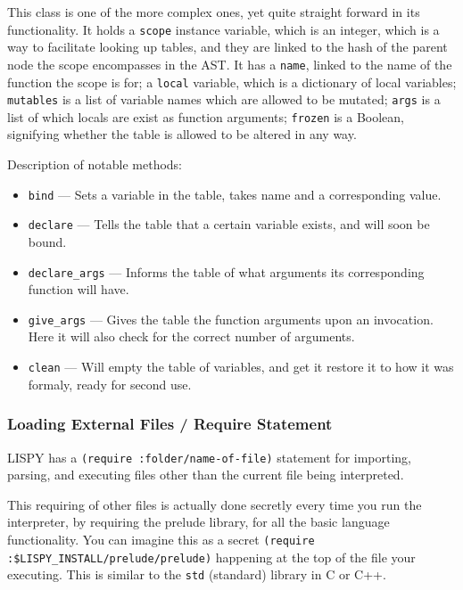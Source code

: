 \documentclass{article}
\newcommand{\code}[1]{\texttt{#1}}
\begin{document}
       This class is one of the more complex ones, yet quite straight forward in
       its functionality.  It holds a \code{scope} instance variable, which is an integer,
       which is a way to facilitate looking up tables, and they are linked to the hash
       of the parent node the scope encompasses in the AST. It has a \code{name}, linked
       to the name of the function the scope is for; a \code{local} variable, which
       is a dictionary of local variables; \code{mutables} is a list of variable names
       which are allowed to be mutated; \code{args} is a list of which locals are
       exist as function arguments; \code{frozen} is a Boolean, signifying whether the
       table is allowed to be altered in any way.

       Description of notable methods:
       \begin{itemize}
         \item \code{bind} --- Sets a variable in the table, takes name and a corresponding
         value.
         \item \code{declare} --- Tells the table that a certain variable exists, and
         will soon be bound.
         \item \code{declare\_args} --- Informs the table of what arguments its corresponding
         function will have.
         \item \code{give\_args} --- Gives the table the function arguments upon an invocation.
         Here it will also check for the correct number of arguments.
         \item \code{clean} --- Will empty the table of variables, and get it restore it to
         how it was formaly, ready for second use.
       \end{itemize}


       \clearpage



    \subsubsection{Loading External Files / Require Statement}
      LISPY has a \code{(require :folder/name-of-file)} statement for importing, parsing,
      and executing files other than the current file being interpreted.

      This requiring of other files is actually done secretly every time you run the interpreter,
      by requiring the prelude library, for all the basic language functionality.
      You can imagine this as a secret \code{(require :\$LISPY\_INSTALL/prelude/prelude)}
      happening at the top of the file your executing. This is similar to the \code{std}
      (standard) library in C or C++.
\end{document}
